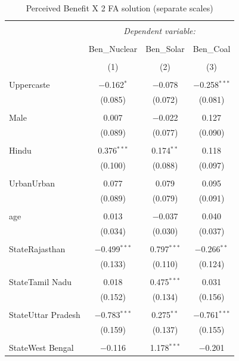 \documentclass[
]{article}
\begin{document}
\begin{table}[!htbp] \centering 
  \caption{Perceived Benefit X 2 FA solution (separate scales)} 
  \label{} 
\begin{tabular}{@{\extracolsep{5pt}}lccc} 
\\[-1.8ex]\hline 
\hline \\[-1.8ex] 
 & \multicolumn{3}{c}{\textit{Dependent variable:}} \\ 
\cline{2-4} 
\\[-1.8ex] & Ben\_Nuclear & Ben\_Solar & Ben\_Coal \\ 
\\[-1.8ex] & (1) & (2) & (3)\\ 
\hline \\[-1.8ex] 
 Uppercaste & $-$0.162$^{*}$ & $-$0.078 & $-$0.258$^{***}$ \\ 
  & (0.085) & (0.072) & (0.081) \\ 
  & & & \\ 
 Male & 0.007 & $-$0.022 & 0.127 \\ 
  & (0.089) & (0.077) & (0.090) \\ 
  & & & \\ 
 Hindu & 0.376$^{***}$ & 0.174$^{**}$ & 0.118 \\ 
  & (0.100) & (0.088) & (0.097) \\ 
  & & & \\ 
 UrbanUrban & 0.077 & 0.079 & 0.095 \\ 
  & (0.089) & (0.079) & (0.091) \\ 
  & & & \\ 
 age & 0.013 & $-$0.037 & 0.040 \\ 
  & (0.034) & (0.030) & (0.037) \\ 
  & & & \\ 
 StateRajasthan & $-$0.499$^{***}$ & 0.797$^{***}$ & $-$0.266$^{**}$ \\ 
  & (0.133) & (0.110) & (0.124) \\ 
  & & & \\ 
 StateTamil Nadu & 0.018 & 0.475$^{***}$ & 0.031 \\ 
  & (0.152) & (0.134) & (0.156) \\ 
  & & & \\ 
 StateUttar Pradesh & $-$0.783$^{***}$ & 0.275$^{**}$ & $-$0.761$^{***}$ \\ 
  & (0.159) & (0.137) & (0.155) \\ 
  & & & \\ 
 StateWest Bengal & $-$0.116 & 1.178$^{***}$ & $-$0.201 \\ 

\end{tabular}
\end{table}
\end{document}
